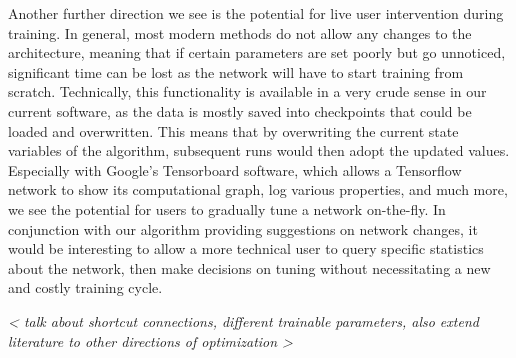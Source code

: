 Another further direction we see is the potential for live user intervention during training.
In general, most modern methods do not allow any changes to the architecture, meaning that if certain parameters are set poorly but go unnoticed, significant time can be lost as the network will have to start training from scratch.
Technically, this functionality is available in a very crude sense in our current software, as the data is mostly saved into checkpoints that could be loaded and overwritten.
This means that by overwriting the current state variables of the algorithm, subsequent runs would then adopt the updated values.
Especially with Google's Tensorboard software, which allows a Tensorflow network to show its computational graph, log various properties, and much more, we see the potential for users to gradually tune a network on-the-fly.
In conjunction with our algorithm providing suggestions on network changes, it would be interesting to allow a more technical user to query specific statistics about the network, then make decisions on tuning without necessitating a new and costly training cycle.



\emph{ < talk about shortcut connections, different trainable parameters, also extend literature to other directions of optimization > }
